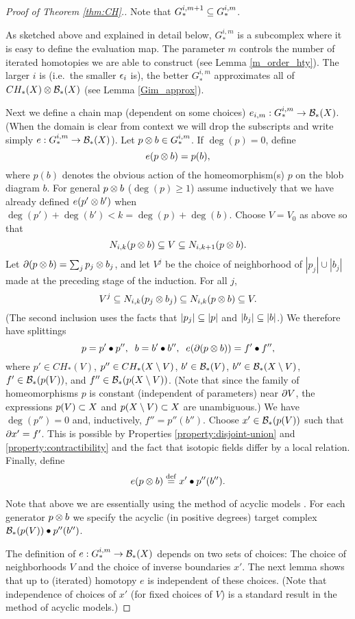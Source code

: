 {\begin{proof}[Proof of Theorem \ref{thm:CH}.]
Note that $G_*^{i,m+1} \subseteq G_*^{i,m}$.

As sketched above and explained in detail below, 
$G_*^{i,m}$ is a subcomplex where it is easy to define
the evaluation map.
The parameter $m$ controls the number of iterated homotopies we are able to construct
(see Lemma \ref{m_order_hty}).
The larger $i$ is (i.e.\ the smaller $\epsilon_i$ is), the better $G_*^{i,m}$ approximates all of
$CH_*(X)\otimes {\mathcal B}_*(X)$ (see Lemma \ref{Gim_approx}).

Next we define a chain map (dependent on some choices) $e_{i,m}: G_*^{i,m} \to {\mathcal B}_*(X)$.
(When the domain is clear from context we will drop the subscripts and write
simply  $e: G_*^{i,m} \to {\mathcal B}_*(X)$).
Let $p\otimes b \in G_*^{i,m}$.
If $\deg(p) = 0$, define
\[
	e(p\otimes b) = p(b) ,
\]
where $p(b)$ denotes the obvious action of the homeomorphism(s) $p$ on the blob diagram $b$.
For general $p\otimes b$ ($\deg(p) \ge 1$) assume inductively that we have already defined
$e(p'\otimes b')$ when $\deg(p') + \deg(b') < k = \deg(p) + \deg(b)$.
Choose $V = V_0$ as above so that 
\[
	N_{i,k}(p\otimes b) \subseteq V \subseteq N_{i,k+1}(p\otimes b) .
\]
Let $\partial(p\otimes b) = \sum_j p_j\otimes b_j$, and let $V^j$ be the choice of neighborhood
of $|p_j|\cup |b_j|$ made at the preceding stage of the induction.
For all $j$, 
\[
	V^j \subseteq N_{i,k}(p_j\otimes b_j) \subseteq N_{i,k}(p\otimes b) \subseteq V .
\]
(The second inclusion uses the facts that $|p_j| \subseteq |p|$ and $|b_j| \subseteq |b|$.)
We therefore have splittings
\[
	p = p'\bullet p'' , \;\; b = b'\bullet b'' , \;\; e(\partial(p\otimes b)) = f'\bullet f'' ,
\]
where $p' \in CH_*(V)$, $p'' \in CH_*(X\setminus V)$, 
$b' \in {\mathcal B}_*(V)$, $b'' \in {\mathcal B}_*(X\setminus V)$, 
$f' \in {\mathcal B}_*(p(V))$, and $f'' \in {\mathcal B}_*(p(X\setminus V))$.
(Note that since the family of homeomorphisms $p$ is constant (independent of parameters)
near $\partial V$, the expressions $p(V) \subset X$ and $p(X\setminus V) \subset X$ are
unambiguous.)
We have $\deg(p'') = 0$ and, inductively, $f'' = p''(b'')$.
Choose $x' \in {\mathcal B}_*(p(V))$ such that $\partial x' = f'$.
This is possible by Properties \ref{property:disjoint-union} and \ref{property:contractibility} 
and the fact that isotopic fields differ by a local relation.
Finally, define
\[
	e(p\otimes b) \stackrel{\mathrm{def}}{=} x' \bullet p''(b'') .
\]

Note that above we are essentially using the method of acyclic models \nn{\S \ref{sec:moam}}.
For each generator $p\otimes b$ we specify the acyclic (in positive degrees) 
target complex ${\mathcal B}_*(p(V)) \bullet p''(b'')$.

The definition of $e: G_*^{i,m} \to {\mathcal B}_*(X)$ depends on two sets of choices:
The choice of neighborhoods $V$ and the choice of inverse boundaries $x'$.
The next lemma shows that up to (iterated) homotopy $e$ is independent
of these choices.
(Note that independence of choices of $x'$ (for fixed choices of $V$)
is a standard result in the method of acyclic models.)


\end{proof}}
